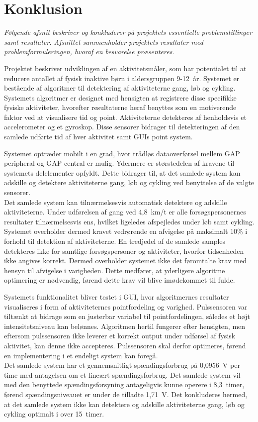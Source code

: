 \section{Konklusion}
\textit{Følgende afsnit beskriver og konkluderer på projektets essentielle problemstillinger samt resultater. Afsnittet sammenholder projektets resultater med problemformuleringen, hvoraf en besvarelse præsenteres.}

Projektet beskriver udviklingen af en aktivitetsmåler, som har potentialet til at reducere antallet af fysisk inaktive børn i aldersgruppen 9-12~år. Systemet er bestående af algoritmer til detektering af aktiviteterne gang, løb og cykling. Systemets algoritmer er designet med hensigten at registrere disse specifikke fysiske aktiviteter, hvorefter resultaterne heraf benyttes som en motiverende faktor ved at visualisere tid og point. Aktiviteterne detekteres af henholdsvis et accelerometer og et gyroskop. Disse sensorer bidrager til detekteringen af den samlede udførte tid af hver aktivitet samt GUIs point system.

Systemet optræder mobilt i en grad, hvor trådløs dataoverførsel mellem GAP peripheral og GAP central er mulig. Ydermere er størstedelen af kravene til systemets delelementer opfyldt. Dette bidrager til, at det samlede system kan adskille og detektere aktiviteterne gang, løb og cykling ved benyttelse af de valgte sensorer. \\
Det samlede system kan tilnærmelsesvis automatisk detektere og adskille aktiviteterne. Under udførelsen af gang ved 4,8~km/t er alle forsøgspersonernes resultater tilnærmelsesvis ens, hvilket ligeledes afspejledes under løb samt cykling. Systemet overholder dermed kravet vedrørende en afvigelse på maksimalt 10\% i forhold til detektion af aktiviteterne. En tredjedel af de samlede samples detekteres ikke for samtlige forsøgspersoner og aktiviteter, hvorfor tidsenheden ikke angives korrekt. Dermed overholder systemet ikke det føromtalte krav med hensyn til afvigelse i varigheden. Dette medfører, at yderligere algoritme optimering er nødvendig, førend dette krav vil blive imødekommet til fulde.

Systemets funktionalitet bliver testet i GUI, hvor algoritmernes resultater visualiseres i form af aktiviteternes pointfordeling og varighed. Pulssensoren var tiltænkt at bidrage som en justerbar variabel til pointfordelingen, således et højt intensitetsniveau kan belønnes. Algoritmen hertil fungerer efter hensigten, men eftersom pulssensoren ikke leverer et korrekt output under udførsel af fysisk aktivitet, kan denne ikke accepteres. Pulssensoren skal derfor optimeres, førend en implementering i et endeligt system kan foregå. \\
Det samlede system har et gennemsnitligt spændingsforbrug på 0,0956~V per time med antagelsen om et lineært spændingsforbrug. Det samlede system vil med den benyttede spændingsforsyning antageligvis kunne operere i 8,3~timer, førend spændingsniveauet er under de tilladte 1,71~V. Det konkluderes hermed, at det samlede system ikke kan detektere og adskille aktiviteterne gang, løb og cykling optimalt i over 15~timer. 

